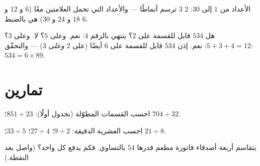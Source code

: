 \begin{omfigure}

{\small الأعداد من $1$ إلى $30$:  $2$  $3$ ترسم
أنماطًا --- والأعداد التي تحمل العلامتين معًا ($6$ و $12$ و $18$
و $24$ و $30$) هي بالضبط  $6$.}
\end{omfigure}

\begin{example}\label{ex:g5:division:criteria}
هل $534$ قابل للقسمة على $2$؟ ينتهي بالرقم $4$: نعم. وعلى $5$؟ لا. وعلى $3$؟
$5 + 3 + 4 = 12$: نعم. إذن $534$ قابل للقسمة على $6$ أيضًا (على $2$
\emph{وعلى} $3$) --- والتحقّق: $534 = 6 \times 89$.
\end{example}

\section{تمارين}

\begin{exercise}[$\star$]\label{exo:g5:division:1}
احسب القسمات المطوّلة (بجدول  أولًا):
$851 \div 23$؛ \quad $704 \div 32$.
\end{exercise}

\begin{exercise}[$\star$]\label{exo:g5:division:2}
احسب  العشرية الدقيقة: $9 \div 2$؛ \quad $27 \div 4$؛
\quad $33 \div 5$؛ \quad $21 \div 8$.
\end{exercise}

\begin{exercise}[$\star$]\label{exo:g5:division:3}
يتقاسم أربعة أصدقاء فاتورة مطعم قدرها $54$ بالتساوي. فكم يدفع
كل واحد؟ (واصل بعد النقطة.)
\end{exercise}

